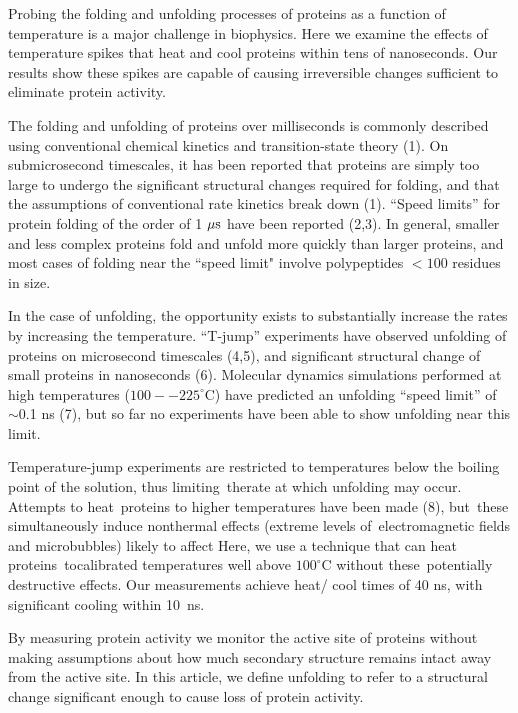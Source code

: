 \documentclass{biophys_letter}
\begin{document}
\vspace*{2.7pt}
\begin{multicols}{2}
Probing the folding and unfolding processes of proteins as a function of temperature is a major challenge in biophysics. Here we examine the effects of temperature spikes that heat and  cool proteins within tens of nanoseconds. Our results show these spikes are capable of causing irreversible changes sufficient to eliminate protein activity.

The folding and unfolding of proteins over milliseconds is commonly described using conventional chemical kinetics and transition-state theory (1). On submicrosecond timescales, it has been reported that proteins are simply too large to undergo the significant structural changes required for folding, and that the assumptions of conventional rate kinetics break down (1). ``Speed limits'' for protein folding of the order of 1 $\mu{\rm s}$ have been reported (2,3). In general, smaller and less complex proteins fold and unfold more quickly than larger proteins, and most cases of folding near the ``speed limit" involve polypeptides ${<}100$ residues in size.

In the case of unfolding, the opportunity exists to substantially increase the rates by increasing the temperature. ``T-jump'' experiments have observed unfolding of proteins on microsecond timescales (4,5), and significant structural change of small proteins in nanoseconds (6). Molecular dynamics simulations performed at high temperatures ($100--225^\circ$C) have predicted an unfolding ``speed limit'' of $\sim$0.1 ns (7), but so far no experiments have been able to show unfolding near this limit.

 Temperature-jump experiments are restricted to temperatures below the boiling point of the solution, thus limiting~the\break rate at which unfolding may occur. Attempts to heat~pro\-teins to higher temperatures have been made (8), but~these simul\-taneously induce nonthermal effects (extreme levels of~elec\-tromagnetic fields and microbubbles) likely to affect  Here, we use a technique that can heat proteins~to\break calibrated temperatures well above $100^\circ$C without these~po\-tentially destructive effects. Our measurements achieve heat/ cool times of 40 ns, with significant cooling within 10~ns.

By measuring protein activity we monitor the active site of proteins without making assumptions about how much secondary structure remains intact away from the active site. In this article, we define unfolding to refer to a structural change significant enough to cause loss of protein activity.


\end{multicols}
\end{document}
